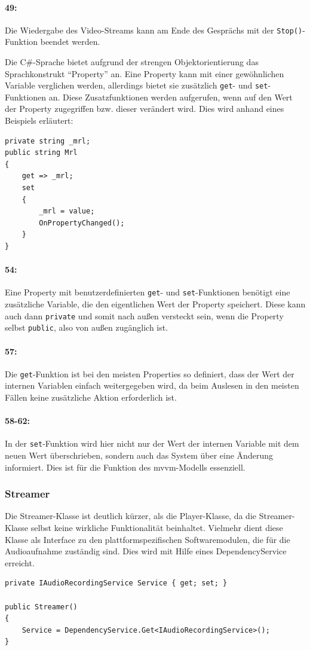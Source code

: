 \paragraph{49:} Die Wiedergabe des Video-Streams kann am Ende des Gesprächs mit der \texttt{Stop()}-Funktion beendet werden.

Die C\#-Sprache bietet aufgrund der strengen Objektorientierung das Sprachkonstrukt \enquote{Property} an.
Eine Property kann mit einer gewöhnlichen Variable verglichen werden, allerdings bietet sie zusätzlich \texttt{get}- und \texttt{set}-Funktionen an.
Diese Zusatzfunktionen werden aufgerufen, wenn auf den Wert der Property zugegriffen bzw. dieser verändert wird.
Dies wird anhand eines Beispiels erläutert:
\begin{verbatim}
private string _mrl;
public string Mrl
{
    get => _mrl;
    set
    {
        _mrl = value;
        OnPropertyChanged();
    }
}
\end{verbatim}
\paragraph{54:} Eine Property mit benutzerdefinierten \texttt{get}- und \texttt{set}-Funktionen benötigt eine zusätzliche Variable, die den eigentlichen Wert der Property speichert.
Diese kann auch dann \texttt{private} und somit nach außen versteckt sein, wenn die Property selbst \texttt{public}, also von außen zugänglich ist.
\paragraph{57:} Die \texttt{get}-Funktion ist bei den meisten Properties so definiert, dass der Wert der internen Variablen einfach weitergegeben wird, da beim Auslesen in den meisten Fällen keine zusätzliche Aktion erforderlich ist.
\paragraph{58-62:} In der \texttt{set}-Funktion wird hier nicht nur der Wert der internen Variable mit dem neuen Wert überschrieben, sondern auch das System über eine Änderung informiert.
Dies ist für die Funktion des \ac{mvvm}-Modells essenziell.
\subsubsection{Streamer}
Die Streamer-Klasse ist deutlich kürzer, als die Player-Klasse, da die Streamer-Klasse selbst keine wirkliche Funktionalität beinhaltet.
Vielmehr dient diese Klasse als Interface zu den plattformspezifischen Softwaremodulen, die für die Audioaufnahme zuständig sind.
Dies wird mit Hilfe eines DependencyService erreicht.
\begin{verbatim}
private IAudioRecordingService Service { get; set; }

public Streamer()
{
    Service = DependencyService.Get<IAudioRecordingService>();
}
\end{verbatim}
